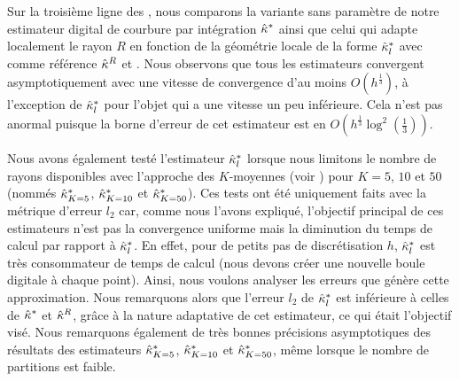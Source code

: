 Sur la troisième ligne des
, nous
comparons la variante sans paramètre de notre estimateur digital de courbure par
intégration $\hat{\kappa}^{*}$ ainsi que celui qui adapte localement le rayon $R$ en
fonction de la géométrie locale de la forme $\hat{\kappa}^{*}_{l}$ avec comme référence
$\hat{\kappa}^{R}$ et \MDCA. Nous observons que tous les estimateurs convergent
asymptotiquement avec une vitesse de convergence d'au moins $O(h^\frac{1}{3})$, à
l'exception de $\hat{\kappa}^{*}_{l}$ pour l'objet \Ellipse qui a une vitesse un peu
inférieure. Cela n'est pas anormal puisque la borne d'erreur de cet estimateur
est en $O\left(h^\frac{1}{3} \log^2\left(\frac{1}{3}\right)\right)$.


Nous avons également testé l'estimateur $\hat{\kappa}^{*}_{l}$ lorsque nous limitons le
nombre de rayons disponibles avec l'approche des $K$-moyennes (voir
) pour $K = 5$, $10$ et $50$
(nommés $\hat{\kappa}^{*}_{K=5}$, $\hat{\kappa}^{*}_{K=10}$ et $\hat{\kappa}^{*}_{K=50}$). Ces tests ont été
uniquement faits avec la métrique d'erreur $l_2$ car, comme nous l'avons
expliqué, l'objectif principal de ces estimateurs n'est pas la convergence
uniforme mais la diminution du temps de calcul par rapport à $\hat{\kappa}^{*}_{l}$. En
effet, pour de petits pas de discrétisation $h$, $\hat{\kappa}^{*}_{l}$ est très
consommateur de temps de calcul (nous devons créer une nouvelle boule digitale à
chaque point). Ainsi, nous voulons analyser les erreurs que génère cette
approximation. Nous remarquons alors que l'erreur $l_2$ de $\hat{\kappa}^{*}_{l}$ est
inférieure à celles de $\hat{\kappa}^{*}$ et $\hat{\kappa}^{R}$, grâce à la nature adaptative de
cet estimateur, ce qui était l'objectif visé. Nous remarquons également de très bonnes précisions
asymptotiques des résultats des estimateurs $\hat{\kappa}^{*}_{K=5}$, $\hat{\kappa}^{*}_{K=10}$ et
$\hat{\kappa}^{*}_{K=50}$, même lorsque le nombre de partitions est faible.
%
